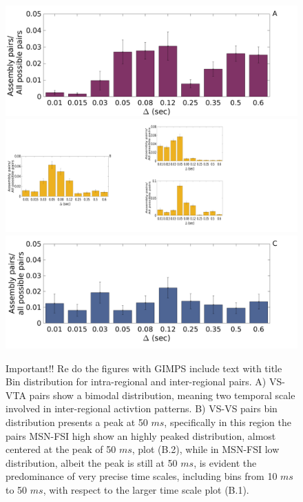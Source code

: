 \begin{figure}[H]
\centering
\includegraphics[scale=0.2]{figures/VS_VTA_SLet.png}
\includegraphics[scale=0.4]{figures/AllBinVSVS.png}
\includegraphics[scale=0.2]{figures/VTA_VTA_SLet.png}

\caption{{\color{red}Important!! Re do the figures with GIMPS include text with title} Bin distribution for intra-regional and inter-regional pairs. A) VS-VTA pairs show a bimodal distribution, meaning two temporal scale involved in inter-regional activtion patterns. B) VS-VS pairs bin distribution presents a peak at 50 $ms$, specifically in this region the pairs MSN-FSI high show an highly peaked distribution, almost centered at the peak of 50 $ms$, plot (B.2), while in MSN-FSI low distribution, albeit the peak is still at 50 $ms$, is evident the predominance of very precise time scales, including bins from 10 $ms$ to 50 $ms$, with respect to the larger time scale plot (B.1).}
\label{fig:BinDistr}
\end{figure}
